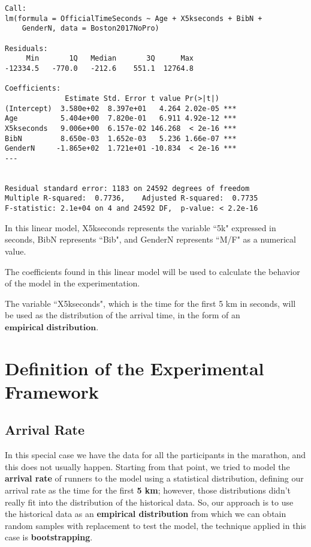 \documentclass[11pt, oneside]{article}   	%
\begin{document}
\begin{lstlisting}
Call:
lm(formula = OfficialTimeSeconds ~ Age + X5kseconds + BibN + 
    GenderN, data = Boston2017NoPro)

Residuals:
     Min       1Q   Median       3Q      Max 
-12334.5   -770.0   -212.6    551.1  12764.8 

Coefficients:
              Estimate Std. Error t value Pr(>|t|)    
(Intercept)  3.580e+02  8.397e+01   4.264 2.02e-05 ***
Age          5.404e+00  7.820e-01   6.911 4.92e-12 ***
X5kseconds   9.006e+00  6.157e-02 146.268  < 2e-16 ***
BibN         8.650e-03  1.652e-03   5.236 1.66e-07 ***
GenderN     -1.865e+02  1.721e+01 -10.834  < 2e-16 ***
---


Residual standard error: 1183 on 24592 degrees of freedom
Multiple R-squared:  0.7736,	Adjusted R-squared:  0.7735 
F-statistic: 2.1e+04 on 4 and 24592 DF,  p-value: < 2.2e-16
\end{lstlisting}

In this linear model, X5kseconds represents the variable ``5k" expressed in seconds, BibN represents ``Bib", and GenderN represents ``M/F" as a numerical value.

The coefficients found in this linear model will be used to calculate the behavior of the model in the experimentation.

The variable ``X5kseconds", which is the time for the first 5 km in seconds, will be used as the distribution of the arrival time, in the form of an $\textbf{empirical distribution}$.

\section{Definition of the Experimental Framework}

\subsection{Arrival Rate}
In this special case we have the data for all the participants in the marathon, and this does not usually happen. Starting from that point, we tried to model the \textbf{arrival rate} of runners to the model using a statistical distribution, defining our arrival rate as the time for the first \textbf{5 km}; however, those distributions didn't really fit into the distribution of the historical data. So, our approach is to use the historical data as an \textbf{empirical distribution} from which we can obtain random samples with replacement to test the model, the technique applied in this case is \textbf{bootstrapping}.
\end{document}
